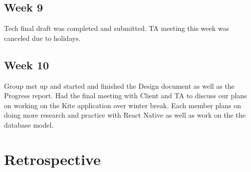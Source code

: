 \documentclass[compsoc, 10, draftclsnofoot, onecolumn]{IEEEtran}
\begin{document}
\subsection{Week 9} Tech final draft was completed and submitted. TA meeting this week was canceled due to holidays.  

\subsection{Week 10} Group met up and started and finished the Design document as well as the Progress report. Had the final meeting with Client and TA to discuss our plans on working on the Kite application over winter break. Each member plans on doing more research and practice with React Native as well as work on the the database model. 
\clearpage
\section{Retrospective}
\end{document}
